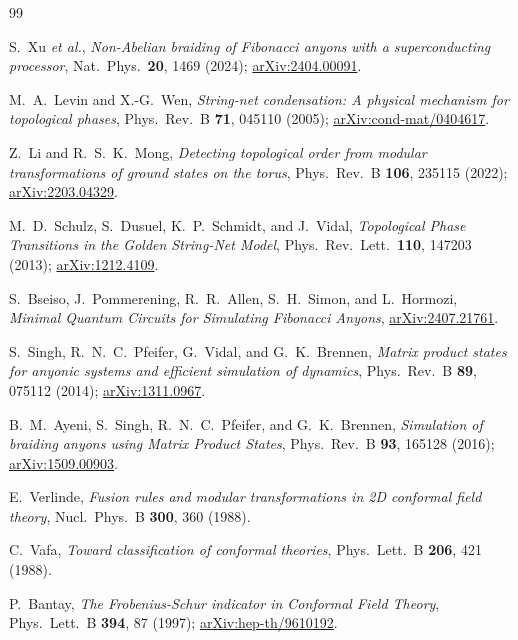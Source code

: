 \documentclass[aps,pra,twocolumn,superscriptaddress,longbibliography,floatfix,nofootinbib]{revtex4-2}
\begin{document}
\begin{thebibliography}{99}

S.~Xu \emph{et al.},
\emph{Non-Abelian braiding of Fibonacci anyons with a superconducting
processor},
Nat.\ Phys.\ \textbf{20}, 1469 (2024);
\href{https://arxiv.org/abs/2404.00091}{arXiv:2404.00091}.

M.~A.~Levin and X.-G.~Wen,
\emph{String-net condensation: A physical mechanism for topological phases},
Phys.\ Rev.\ B \textbf{71}, 045110 (2005);
\href{https://arxiv.org/abs/cond-mat/0404617}{arXiv:cond-mat/0404617}.

Z.~Li and R.~S.~K.~Mong,
\emph{Detecting topological order from modular transformations of ground states
on the torus},
Phys.\ Rev.\ B \textbf{106}, 235115 (2022);
\href{https://arxiv.org/abs/2203.04329}{arXiv:2203.04329}.

M.~D.~Schulz, S.~Dusuel, K.~P.~Schmidt, and J.~Vidal,
\emph{Topological Phase Transitions in the Golden String-Net Model},
Phys.\ Rev.\ Lett.\ \textbf{110}, 147203 (2013);
\href{https://arxiv.org/abs/1212.4109}{arXiv:1212.4109}.

S.~Bseiso, J.~Pommerening, R.~R.~Allen, S.~H.~Simon, and L.~Hormozi,
\emph{Minimal Quantum Circuits for Simulating Fibonacci Anyons},
\href{https://arxiv.org/abs/2407.21761}{arXiv:2407.21761}.

S.~Singh, R.~N.~C.~Pfeifer, G.~Vidal, and G.~K.~Brennen,
\emph{Matrix product states for anyonic systems and efficient simulation of
dynamics},
Phys.\ Rev.\ B \textbf{89}, 075112 (2014);
\href{https://arxiv.org/abs/1311.0967}{arXiv:1311.0967}.

B.~M.~Ayeni, S.~Singh, R.~N.~C.~Pfeifer, and G.~K.~Brennen,
\emph{Simulation of braiding anyons using Matrix Product States},
Phys.\ Rev.\ B \textbf{93}, 165128 (2016);
\href{https://arxiv.org/abs/1509.00903}{arXiv:1509.00903}.

E.~Verlinde,
\emph{Fusion rules and modular transformations in 2D conformal field theory},
Nucl.\ Phys.\ B \textbf{300}, 360 (1988).

C.~Vafa,
\emph{Toward classification of conformal theories},
Phys.\ Lett.\ B \textbf{206}, 421 (1988).

P.~Bantay,
\emph{The Frobenius-Schur indicator in Conformal Field Theory},
Phys.\ Lett.\ B \textbf{394}, 87 (1997);
\href{https://arxiv.org/abs/hep-th/9610192}{arXiv:hep-th/9610192}.


\end{thebibliography}
\end{document}
